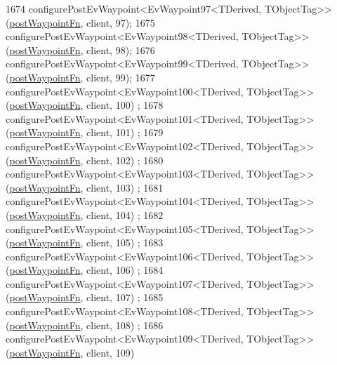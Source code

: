 \begin{DoxyCode}
1674     configurePostEvWaypoint<EvWaypoint97<TDerived, TObjectTag>>(\hyperlink{classmove__base__z__client_1_1WaypointEventDispatcher_acc538eb7506c13f7cca2268a1742dadd}{postWaypointFn}, client, 97);
1675     configurePostEvWaypoint<EvWaypoint98<TDerived, TObjectTag>>(\hyperlink{classmove__base__z__client_1_1WaypointEventDispatcher_acc538eb7506c13f7cca2268a1742dadd}{postWaypointFn}, client, 98);
1676     configurePostEvWaypoint<EvWaypoint99<TDerived, TObjectTag>>(\hyperlink{classmove__base__z__client_1_1WaypointEventDispatcher_acc538eb7506c13f7cca2268a1742dadd}{postWaypointFn}, client, 99);
1677     configurePostEvWaypoint<EvWaypoint100<TDerived, TObjectTag>>(\hyperlink{classmove__base__z__client_1_1WaypointEventDispatcher_acc538eb7506c13f7cca2268a1742dadd}{postWaypointFn}, client, 100)
      ;
1678     configurePostEvWaypoint<EvWaypoint101<TDerived, TObjectTag>>(\hyperlink{classmove__base__z__client_1_1WaypointEventDispatcher_acc538eb7506c13f7cca2268a1742dadd}{postWaypointFn}, client, 101)
      ;
1679     configurePostEvWaypoint<EvWaypoint102<TDerived, TObjectTag>>(\hyperlink{classmove__base__z__client_1_1WaypointEventDispatcher_acc538eb7506c13f7cca2268a1742dadd}{postWaypointFn}, client, 102)
      ;
1680     configurePostEvWaypoint<EvWaypoint103<TDerived, TObjectTag>>(\hyperlink{classmove__base__z__client_1_1WaypointEventDispatcher_acc538eb7506c13f7cca2268a1742dadd}{postWaypointFn}, client, 103)
      ;
1681     configurePostEvWaypoint<EvWaypoint104<TDerived, TObjectTag>>(\hyperlink{classmove__base__z__client_1_1WaypointEventDispatcher_acc538eb7506c13f7cca2268a1742dadd}{postWaypointFn}, client, 104)
      ;
1682     configurePostEvWaypoint<EvWaypoint105<TDerived, TObjectTag>>(\hyperlink{classmove__base__z__client_1_1WaypointEventDispatcher_acc538eb7506c13f7cca2268a1742dadd}{postWaypointFn}, client, 105)
      ;
1683     configurePostEvWaypoint<EvWaypoint106<TDerived, TObjectTag>>(\hyperlink{classmove__base__z__client_1_1WaypointEventDispatcher_acc538eb7506c13f7cca2268a1742dadd}{postWaypointFn}, client, 106)
      ;
1684     configurePostEvWaypoint<EvWaypoint107<TDerived, TObjectTag>>(\hyperlink{classmove__base__z__client_1_1WaypointEventDispatcher_acc538eb7506c13f7cca2268a1742dadd}{postWaypointFn}, client, 107)
      ;
1685     configurePostEvWaypoint<EvWaypoint108<TDerived, TObjectTag>>(\hyperlink{classmove__base__z__client_1_1WaypointEventDispatcher_acc538eb7506c13f7cca2268a1742dadd}{postWaypointFn}, client, 108)
      ;
1686     configurePostEvWaypoint<EvWaypoint109<TDerived, TObjectTag>>(\hyperlink{classmove__base__z__client_1_1WaypointEventDispatcher_acc538eb7506c13f7cca2268a1742dadd}{postWaypointFn}, client, 109)

\end{DoxyCode}
